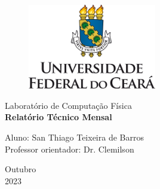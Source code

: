 \documentclass[a4paper, 12pt]{article}
\begin{document}

\def\nome{San Thiago Teixeira de Barros}
\def\orientador{Dr. Clemilson}
\def\projeto{Laboratório de Computação Física}
\def\relatorio{Relatório Técnico Mensal}
\def\mes{Outubro}

\begin{titlepage}
	\begin{center}
        \begin{figure}[h]
            \centering
            \includegraphics[width=0.5\textwidth]{images/logo.png}
        \end{figure}
		\large{\projeto}\\ 
		\vspace{15pt}
        \vspace{95pt}
        \textbf{\LARGE{\relatorio}}\\
		\vspace{3,5cm}
	\end{center}
	
	\begin{flushleft}
		\begin{tabbing}
			Aluno: \nome\\
			Professor orientador: \orientador\\
	\end{tabbing}
 \end{flushleft}
	\vspace{1cm}
	
	\begin{center}
		\vspace{\fill}
			 \mes\\
		 2023
			\end{center}
\end{titlepage}

\end{document}
